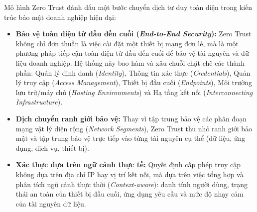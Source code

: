 Mô hình Zero Trust đánh dấu một bước chuyển dịch tư duy toàn diện trong kiến trúc bảo mật doanh nghiệp hiện đại:
\begin{itemize}
    \item \textbf{Bảo vệ toàn diện từ đầu đến cuối (\textit{End-to-End Security}):} Zero Trust không chỉ đơn thuần là việc cài đặt một thiết bị mạng đơn lẻ, mà là một phương pháp tiếp cận toàn diện từ đầu đến cuối để bảo vệ tài nguyên và dữ liệu doanh nghiệp. Hệ thống này bao hàm và xâu chuỗi chặt chẽ các thành phần: Quản lý định danh (\textit{Identity}), Thông tin xác thực (\textit{Credentials}), Quản lý truy cập (\textit{Access Management}), Thiết bị đầu cuối (\textit{Endpoints}), Môi trường lưu trữ/máy chủ (\textit{Hosting Environments}) và Hạ tầng kết nối (\textit{Interconnecting Infrastructure}).
    
    \item \textbf{Dịch chuyển ranh giới bảo vệ:} Thay vì tập trung bảo vệ các phân đoạn mạng vật lý diện rộng (\textit{Network Segments}), Zero Trust thu nhỏ ranh giới bảo mật và tập trung bảo vệ trực tiếp vào từng tài nguyên cụ thể (dữ liệu, ứng dụng, dịch vụ, thiết bị).
    
    \item \textbf{Xác thực dựa trên ngữ cảnh thực tế:} Quyết định cấp phép truy cập không dựa trên địa chỉ IP hay vị trí kết nối, mà dựa trên việc tổng hợp và phân tích ngữ cảnh thực thời (\textit{Context-aware}): danh tính người dùng, trạng thái an toàn của thiết bị đầu cuối, ứng dụng yêu cầu và mức độ nhạy cảm của tài nguyên dữ liệu.
\end{itemize}